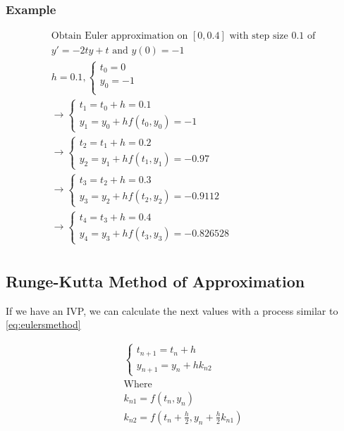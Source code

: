 \documentclass[12pt, landscape, twocolumn]{article}
\begin{document}
        \subsubsection{Example}
        \[
        \begin{aligned}
        \text{Obtain Euler approximation on }[0, 0.4] \text{ with step size } 0.1 \text{ of}\\
        y\prime = -2ty + t \text{ and } y(0) = -1\\
        h = 0.1, 
        \begin{cases}
        t_0 = 0\\
        y_0 = -1\\
        \end{cases} \\
        \to \begin{cases}
        t_1 = t_0 + h = 0.1\\
        y_1 = y_0 + h f(t_0, y_0) = -1
        \end{cases}\\
        \to \begin{cases}
        t_2 = t_1 + h = 0.2\\
        y_2 = y_1 + h f(t_1, y_1) = -0.97
        \end{cases}\\
        \to \begin{cases}
        t_3 = t_2 + h = 0.3\\
        y_3 = y_2 + h f(t_2, y_2) = -0.9112
        \end{cases}\\
        \to \begin{cases}
        t_4 = t_3 + h = 0.4\\
        y_4 = y_3 + h f(t_3, y_3) = -0.826528
        \end{cases}\\
        \end{aligned}
        \]
    \subsection{Runge-Kutta Method of Approximation}
    If we have an IVP, we can calculate the next values with a process similar to \eqref{eq:eulersmethod}

    \begin{equation}\label{eq:2ork}
    \begin{aligned}
    \begin{cases}
    t_{n+1} = t_n + h\\
    y_{n+1} = y_n + h k_{n2}
    \end{cases}\\
    \text{Where}\\
    k_{n1} = f(t_n, y_n)\\
    k_{n2} = f \left( t_n + \frac{h}{2}, y_n + \frac{h}{2} k_{n1} \right)
    \end{aligned}
    \end{equation}
\end{document}
